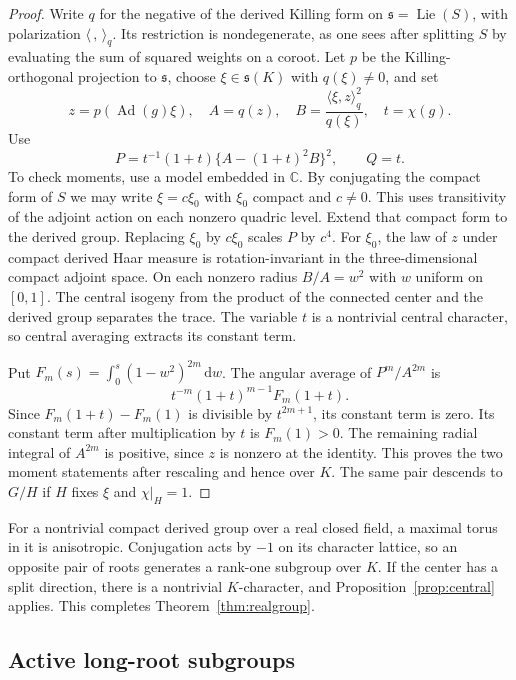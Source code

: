 \documentclass[11pt]{article}
\newcommand{\CC}{\mathbb C}
\newcommand{\Lie}{\operatorname{Lie}}
\newcommand{\dd}{\,\mathrm d}
\DeclareMathOperator{\Ad}{Ad}
\begin{document}
\begin{proof}
Write \(q\) for the negative of the derived Killing form on
\(\mathfrak s=\Lie(S)\), with polarization \(\langle\,,\,\rangle_q\).
Its restriction is nondegenerate, as one sees after splitting \(S\)
by evaluating the sum of squared weights on a coroot. Let \(p\) be
the Killing-orthogonal projection to \(\mathfrak s\), choose
\(\xi\in\mathfrak s(K)\) with \(q(\xi)\ne0\), and set
\[
 z=p(\Ad(g)\xi),\quad A=q(z),\quad
 B=\frac{\langle\xi,z\rangle_q^2}{q(\xi)},\quad t=\chi(g).
\]
Use
\begin{equation}\label{eq:angular}
 P=t^{-1}(1+t)\{A-(1+t)^2B\}^{2},\qquad Q=t .
\end{equation}
To check moments, use a model embedded in \(\CC\). By conjugating
the compact form of \(S\) we may write \(\xi=c\xi_0\) with \(\xi_0\)
compact and \(c\ne0\). This uses transitivity of the adjoint action
on each nonzero quadric level. Extend that compact form to the
derived group. Replacing \(\xi_0\) by \(c\xi_0\) scales \(P\) by
\(c^4\). For \(\xi_0\), the law of \(z\) under compact derived Haar
measure is rotation-invariant in the three-dimensional compact
adjoint space. On each nonzero radius \(B/A=w^2\) with \(w\)
uniform on \([0,1]\). The central isogeny from the product of the
connected center and the derived group separates the trace.
The variable \(t\) is a nontrivial central character, so central
averaging extracts its constant term.

Put \(F_m(s)=\int_0^s(1-w^2)^{2m}\dd w\). The angular average of
\(P^m/A^{2m}\) is
\[
                  t^{-m}(1+t)^{m-1}F_m(1+t).
\]
Since \(F_m(1+t)-F_m(1)\) is divisible by \(t^{2m+1}\), its constant
term is zero. Its constant term after multiplication by \(t\)
is \(F_m(1)>0\). The remaining radial integral of \(A^{2m}\)
is positive, since \(z\) is nonzero at the identity. This proves
the two moment statements after rescaling and hence over \(K\).
The same pair descends to \(G/H\) if \(H\) fixes \(\xi\) and
\(\chi|_H=1\).
\end{proof}

For a nontrivial compact derived group over a real closed field,
a maximal torus in it is anisotropic. Conjugation acts by \(-1\)
on its character lattice, so an opposite pair of roots generates
a rank-one subgroup over \(K\). If the center has a split direction,
there is a nontrivial \(K\)-character, and Proposition~\ref{prop:central}
applies. This completes Theorem~\ref{thm:realgroup}.

\subsection{Active long-root subgroups}
\end{document}
